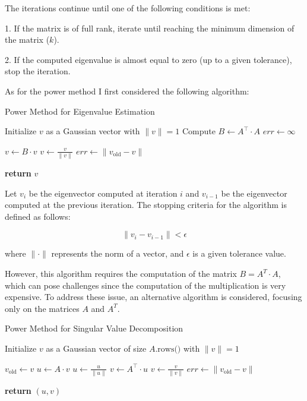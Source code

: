 \documentclass{article}
\begin{document}
The iterations continue until one of the following conditions is met:

1. If the matrix is of full rank, iterate until reaching the minimum dimension of the matrix (\( k \)).

2. If the computed eigenvalue is almost equal to zero (up to a given tolerance), stop the iteration.

\vspace{\baselineskip}
As for the power method I first considered the following algorithm:
\begin{algorithm}
\caption{Power Method for Eigenvalue Estimation}
\begin{algorithmic}[1]
    \State Initialize $v$ as a Gaussian vector with $\|v\| = 1$
    \State Compute $B \gets A^\top \cdot A$
    \State $err \gets \infty$
    
        \State $v \gets B \cdot v$
        \State $v \gets \frac{v}{\|v\|}$
        \State $err \gets \|v_{\text{old}} - v\|$
    \EndWhile

    \State \textbf{return} $v$
\EndFunction
\end{algorithmic}
\end{algorithm}

Let \(v_i\) be the eigenvector computed at iteration \(i\) and \(v_{i-1}\) be the eigenvector computed at the previous iteration. The stopping criteria for the algorithm is defined as follows:

\[ \lVert v_i - v_{i-1} \rVert < \epsilon \]

where \(\lVert \cdot \rVert\) represents the norm of a vector, and \(\epsilon\) is a given tolerance value.

\vspace{\baselineskip}
However, this algorithm requires the computation of the matrix \(B = A^T \cdot A\), which can pose challenges since the computation of the multiplication is very expensive. To address these issue, an alternative algorithm is considered, focusing only on the matrices \(A\) and \(A^T\).

\begin{algorithm}
\caption{Power Method for Singular Value Decomposition}
\begin{algorithmic}[1]
    \State Initialize $v$ as a Gaussian vector of size $A.\text{rows()}$ with $\|v\| = 1$

        \State $v_{\text{old}} \gets v$
        \State $u \gets A \cdot v$
        \State $u \gets \frac{u}{\|u\|}$
        \State $v \gets A^\top \cdot u$
        \State $v \gets \frac{v}{\|v\|}$
        \State $err \gets \|v_{\text{old}} - v\|$
    \EndWhile

    \State \textbf{return} $(u, v)$
\EndFunction
\end{algorithmic}
\end{algorithm}
\end{document}
